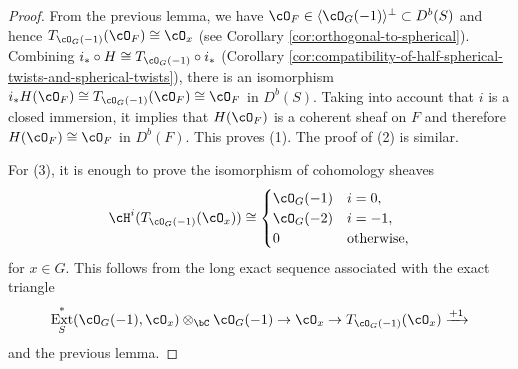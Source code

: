 \documentclass[12pt]{amsart}
\numberwithin{equation}{section}
\theoremstyle{plain}
\theoremstyle{definition}
\DeclareMathOperator{\Ext}{\mathrm{Ext}}
\begin{document}
\begin{proof}
    From the previous lemma, we have $\cO_F \in \langle \cO_G(-1) \rangle^\perp \subset D^b(S)$ and hence $T_{\cO_G(-1)}(\cO_F) \cong \cO_x$ (see Corollary \ref{cor:orthogonal-to-spherical}).
    Combining $i_* \circ H \cong T_{\cO_G(-1)} \circ i_*$ (Corollary \ref{cor:compatibility-of-half-spherical-twists-and-spherical-twists}), there is an isomorphism $i_*H(\cO_F) \cong T_{\cO_G(-1)}(\cO_F) \cong \cO_F$ in $D^b(S)$.
    Taking into account that $i$ is a closed immersion, it implies that $H(\cO_F)$ is a coherent sheaf on $F$ and therefore $H(\cO_F) \cong \cO_F$ in $D^b(F)$.
    This proves (1).
    The proof of (2) is similar.

    For (3), it is enough to prove the isomorphism of cohomology sheaves
    \begin{equation}
        \cH^i(T_{\cO_G(-1)}(\cO_x)) \cong \begin{cases}
            \cO_G(-1) & i = 0,            \\
            \cO_G(-2) & i = -1,           \\
            0         & \text{otherwise},
        \end{cases}
    \end{equation}
    for $x \in G$.
    This follows from the long exact sequence associated with the exact triangle
    \begin{equation}
        \Ext^*_S(\cO_G(-1), \cO_x) \otimes_\bC \cO_G(-1)\to \cO_x \to T_{\cO_G(-1)}(\cO_x) \xrightarrow{+1}
    \end{equation}
    and the previous lemma.
\end{proof}
\end{document}
